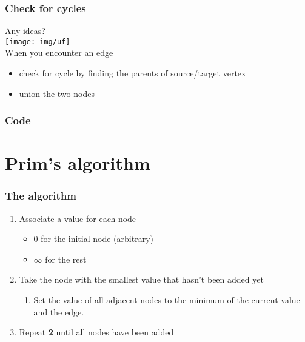 \documentclass[12pt]{beamer}
\begin{document}
\begin{frame}
	\frametitle{Check for cycles}
	Any ideas?\\
	\pause
	\texttt{[image: img/uf]}\\
	\pause
	When you encounter an edge
	\begin{itemize}
		\item check for cycle by finding the parents of source/target vertex
		\item union the two nodes 
	\end{itemize}
	

\end{frame}
\begin{frame}
	\frametitle{Code}
	
\end{frame}

\section{Prim's algorithm}

\begin{frame}
	\frametitle{The algorithm}
	\begin{enumerate}
		\item Associate a value for each node
		\begin{itemize}
			\item $0$ for the initial node (arbitrary)
			\item $\infty$ for the rest
		\end{itemize}
		\item Take the node with the smallest value that hasn't been added yet
		\begin{enumerate}
			\item Set the value of all adjacent nodes to the minimum of the current value and the edge.
		\end{enumerate}
		\item Repeat \textbf{2} until all nodes have been added
	\end{enumerate}
\end{frame}
\end{document}
